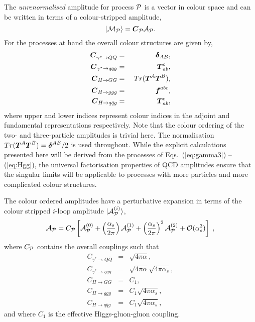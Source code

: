 \documentclass[paper,notoc,nohyper]{JHEP3}
\def\P{{\cal P}}
\def\bom#1{{\mbox{\boldmath $#1$}}}
\begin{document}
The {\em unrenormalised}
amplitude for process ${\cal P}$ is a vector in colour space and can be written
in terms of a colour-stripped amplitude,
\begin{equation}
|{\cal M}_{\P}\rangle = {\bom C_{\P}} {\cal A}_{\P}.
\end{equation}
For the processes at hand the overall colour structures are given by,
\begin{eqnarray}
{\bom C_{\gamma^* \to Q\bar Q}} &=&   ~{\bom \delta_{AB}},\\
{\bom C_{\gamma^* \to q\bar q g}} &=&   ~{\bom T^c_{ab}},\\
{\bom C_{H \to G  G}} &=& ~Tr(\bom T^{A}}{\bom T^{B}),\\
{\bom C_{H \to g g g}} &=&  ~{\bom f^{abc}},\\
{\bom C_{H \to q \bar q g  }} &=& ~{\bom T^c_{ab}},
\end{eqnarray}
where upper and lower indices represent colour 
indices in the adjoint and fundamental 
representations respectively.
Note that the colour ordering of the two- and three-particle amplitudes is
trivial here.  
The normalisation $Tr(\bom T^A\bom T^B)={\bom \delta^{AB}}/{2}$ is 
used throughout. 
While the explicit calculations presented here will be derived from the
processes of Eqs.~(\ref{eq:gamma3}) --(\ref{eq:Hgg}), the universal
factorisation properties of QCD amplitudes ensure that the singular limits will
be applicable to
processes with more particles and more complicated colour structures.

The colour ordered amplitudes have a perturbative
expansion in terms of the colour stripped $i$-loop amplitude
$|{\cal A}_{\P}^{(i)}\rangle$,
\begin{equation}
{\cal A}_{\P} = C_{\P} \left[
{\cal A}_{\P}^{(0)} 
+ \left(\frac{\alpha_s}{2\pi}\right) {\cal A}_{\P}^{(1)} 
+ \left(\frac{\alpha_s}{2\pi}\right)^2 {\cal A}_{\P}^{(2)} 
+ {\cal O}(\alpha_s^3) \right] \;,
\label{eq:renorme}
\end{equation}
where $C_{\P}$ contains the overall couplings such that
\begin{eqnarray}
C_{\gamma^* \to Q\bar Q} &=& \sqrt{4\pi\alpha} ,\\
C_{\gamma^* \to q\bar q g} &=& \sqrt{4\pi\alpha}\sqrt{4\pi\alpha_s} ,\\
C_{H \to G  G} &=& C_1,\\
C_{H \to g g g} &=& C_1\sqrt{4\pi\alpha_s} ,\\
C_{H \to q  \bar q g  } &=& C_1\sqrt{4\pi\alpha_s} ,
\end{eqnarray}
and where $C_1$ is the effective Higgs-gluon-gluon coupling. 
\end{document}
